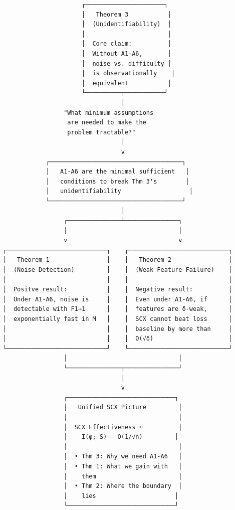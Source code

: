 \documentclass[
  12pt,
]{ctexart}
\begin{document}
\begin{verbatim}
                         ┌──────────────────────┐
                         │   Theorem 3           │
                         │  (Unidentifiability)  │
                         │                       │
                         │  Core claim:          │
                         │  Without A1-A6,       │
                         │  noise vs. difficulty │
                         │  is observationally    │
                         │  equivalent           │
                         └──────────┬───────────┘
                                    │
                    "What minimum assumptions
                     are needed to make the
                     problem tractable?"
                                    │
                                    v
               ┌─────────────────────────────────────┐
               │   A1-A6 are the minimal sufficient   │
               │   conditions to break Thm 3's        │
               │   unidentifiability                   │
               └─────────────────────────────────────┘
                                    │
                    ┌───────────────┴───────────────┐
                    │                               │
                    v                               v
   ┌────────────────────────────┐    ┌────────────────────────────┐
   │   Theorem 1                │    │   Theorem 2                │
   │  (Noise Detection)         │    │  (Weak Feature Failure)    │
   │                            │    │                            │
   │  Positve result:           │    │  Negative result:          │
   │  Under A1-A6, noise is     │    │  Even under A1-A6, if      │
   │  detectable with F1→1      │    │  features are δ-weak,      │
   │  exponentially fast in M   │    │  SCX cannot beat loss      │
   │                            │    │  baseline by more than     │
   │                            │    │  O(√δ)                     │
   └────────────────────────────┘    └────────────────────────────┘
                    │                               │
                    └───────────────┬───────────────┘
                                    │
                                    v
                    ┌──────────────────────────────┐
                    │   Unified SCX Picture         │
                    │                               │
                    │  SCX Effectiveness ≈          │
                    │    I(φ; S) - O(1/√n)         │
                    │                               │
                    │  • Thm 3: Why we need A1-A6   │
                    │  • Thm 1: What we gain with   │
                    │    them                       │
                    │  • Thm 2: Where the boundary  │
                    │    lies                      │
                    └──────────────────────────────┘
\end{verbatim}
\end{document}
